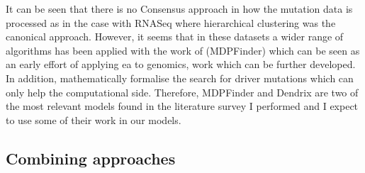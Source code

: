 It can be seen that there is no Consensus approach in how the mutation data is processed as in the case with RNASeq where hierarchical clustering was the canonical approach. However, it seems that in these datasets a wider range of algorithms has been applied with the work of \citet{Zhao2012-wj} (MDPFinder) which can be seen as an early effort of applying \acrshort{ea} to genomics, work which can be further developed. In addition, \citet{Vandin2012-cf} mathematically formalise the search for driver mutations which can only help the computational side. Therefore, MDPFinder and Dendrix are two of the most relevant models found in the literature survey I performed and I expect to use some of their work in our models.





\subsection{Combining approaches} \label{s:multi-view}

\vspace{3mm}
\vspace{3mm}

